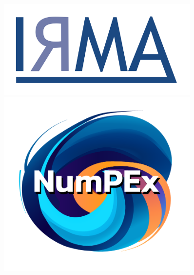 \documentclass{beamer}
\begin{document}
\begin{frame}
    \begin{figure}
        \begin{minipage}{0.33\textwidth}
            \centering
            \includegraphics[width=0.9\textwidth]{../image/logo_irma.png}
        \end{minipage}%
        \begin{minipage}{0.33\textwidth}
            \centering
            \includegraphics[width=0.9\textwidth]{../image/logo-numpex-web-2.png}
        \end{minipage}%
        \begin{minipage}{0.33\textwidth}
            \centering

\end{minipage}
\end{figure}
\end{frame}
\end{document}

